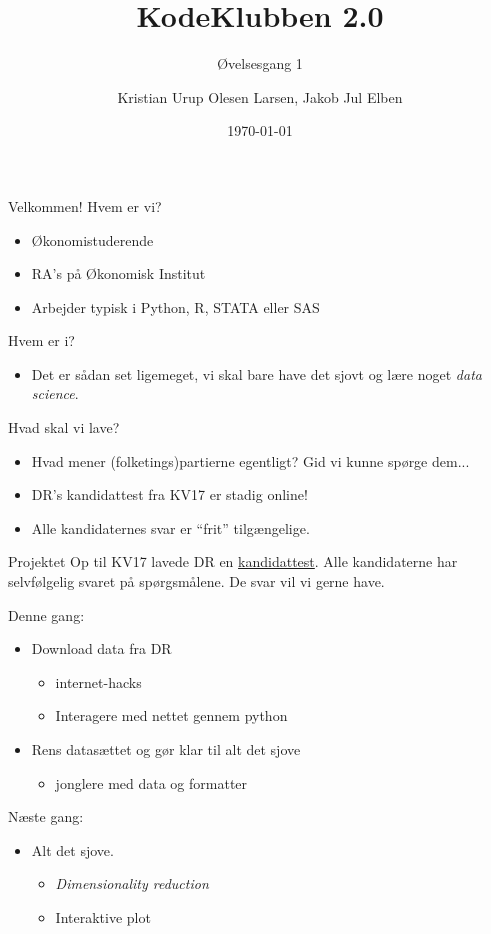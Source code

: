 \documentclass[10pt, hyperref = {colorlinks=true, linkcolor=green}]{beamer}
\title{KodeKlubben 2.0}
\subtitle{Øvelsesgang 1}
\date{\today}
\author{Kristian Urup Olesen Larsen, Jakob Jul Elben}
\institute{Økonomisk Institut, KU}
\begin{document}
\maketitle

\begin{frame}[fragile]{Velkommen!}
Hvem er vi?
\begin{itemize}
  \item Økonomistuderende
  \item RA's på Økonomisk Institut
  \item Arbejder typisk i Python, R, STATA eller SAS
\end{itemize}
Hvem er i?
\begin{itemize}
  \item Det er sådan set ligemeget, vi skal bare have det sjovt og lære noget \textit{data science}.
\end{itemize}
\end{frame}

\begin{frame}[fragile]{Hvad skal vi lave?}
\begin{itemize}
  \item<1-> Hvad mener (folketings)partierne egentligt? Gid vi kunne spørge dem...
  \item<2-> DR's kandidattest fra KV17 er stadig online!
  \item<3-> Alle kandidaternes svar er ``frit'' tilgængelige.
\end{itemize}
\end{frame}

\begin{frame}[fragile]{Projektet}
Op til KV17 lavede DR en \href{https://www.dr.dk/nyheder/politik/kv17/kandidat-testen}{kandidattest}. Alle kandidaterne har selvfølgelig svaret på spørgsmålene. De svar vil vi gerne have.

Denne gang:
\begin{itemize}
  \item Download data fra DR
  \begin{itemize}
    \item internet-hacks
    \item Interagere med nettet gennem python
  \end{itemize}
  \item Rens datasættet og gør klar til alt det sjove
  \begin{itemize}
    \item jonglere med data og formatter
  \end{itemize}
\end{itemize}

Næste gang:
\begin{itemize}
  \item Alt det sjove.
  \begin{itemize}
    \item \textit{Dimensionality reduction}
    \item Interaktive plot
  \end{itemize}
\end{itemize}
\end{frame}
\end{document}
